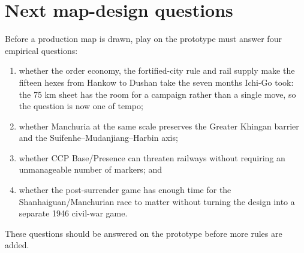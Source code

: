 \documentclass[11pt]{article}
\begin{document}
\section{Next map-design questions}
Before a production map is drawn, play on the prototype must answer four empirical questions:
\begin{enumerate}
\item whether the order economy, the fortified-city rule and rail supply make the fifteen hexes from Hankow to Dushan take the seven months Ichi-Go took: the 75 km sheet has the room for a campaign rather than a single move, so the question is now one of tempo;
\item whether Manchuria at the same scale preserves the Greater Khingan barrier and the Suifenhe--Mudanjiang--Harbin axis;
\item whether CCP Base/Presence can threaten railways without requiring an unmanageable number of markers; and
\item whether the post-surrender game has enough time for the Shanhaiguan/Manchurian race to matter without turning the design into a separate 1946 civil-war game.
\end{enumerate}

These questions should be answered on the prototype before more rules are added.
\end{document}

